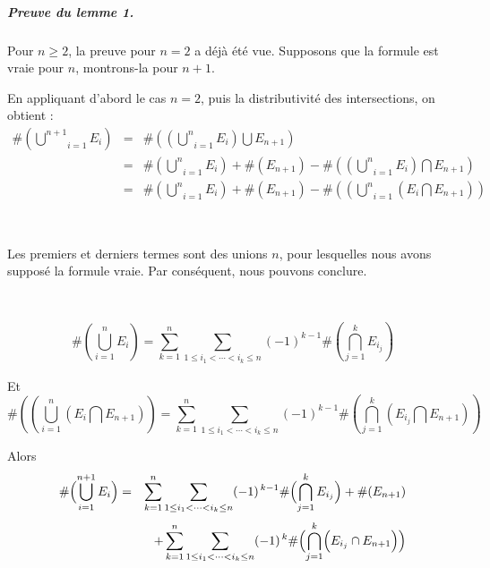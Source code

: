 \subparagraph{Preuve du lemme 1.}

Pour $n \geqslant 2$, la preuve pour $n = 2$ a d{\'e}j{\`a} {\'e}t{\'e} vue.
Supposons que la formule est vraie pour $n$, montrons-la pour $n + 1$.

En appliquant d'abord le cas $n = 2$, puis la distributivit{\'e} des
intersections, on obtient :
\begin{eqnarray*}
  \# \left( \underset{i = 1}{\overset{n + 1}{\bigcup}} E_i \right) & = & \#
  \left( \left( \underset{i = 1}{\overset{n}{\bigcup}} E_i \right) \bigcup
  E_{n + 1} \right)\\
  & = & \# \left( \underset{i = 1}{\overset{n}{\bigcup}} E_i \right) +\#
  (E_{n + 1}) -\# \left( \left( \underset{i = 1}{\overset{n}{\bigcup}} E_i
  \right) \bigcap E_{n + 1} \right)\\
  & = & \# \left( \underset{i = 1}{\overset{n}{\bigcup}} E_i \right) +\#
  (E_{n + 1}) -\# \left( \left( \underset{i = 1}{\overset{n}{\bigcup}} \right.
  \left( E_i \bigcap E_{n + 1} \right) \right)
\end{eqnarray*}


\

Les premiers et derniers termes sont des unions $n$, pour lesquelles nous
avons suppos{\'e} la formule vraie. Par cons{\'e}quent, nous pouvons conclure.

\


\[ \# \left( \underset{i = 1}{\overset{n}{\bigcup}} E_i \right) =
   \underset{}{\overset{n}{\underset{k = 1}{\sum}} \underset{1 \leqslant i_1 <
   \cdots < i_k \leqslant n}{\sum} (- 1)^{k - 1} \# \left(
   \overset{k}{\underset{j = 1}{\bigcap}} E_{i_j} \right)} \]


Et
\[ \# \left( \left( \underset{i = 1}{\overset{n}{\bigcup}} \right. \left( E_i
   \bigcap E_{n + 1} \right) \right) = \overset{n}{\underset{k = 1}{\sum}}
   \underset{1 \leqslant i_1 < \cdots < i_k \leqslant n}{\sum} (- 1)^{k - 1}
   \# \left( \overset{k}{\underset{j = 1}{\bigcap}} \left( E_{i_j} \bigcap
   E_{n + 1} \right) \right) \]


Alors
\begin{eqnarray*}
\#\Bigl(\bigcup_{i=1}^{n+1} E_i\Bigr)
& = &
\sum_{k=1}^{n} \sum_{1 \le i_1 < \cdots < i_k \le n} (-1)^{\,k-1} \#\Bigl(\bigcap_{j=1}^{k} E_{i_j}\Bigr)
+ \#(E_{n+1}) \\[1mm]
& & + \sum_{k=1}^{n} \sum_{1 \le i_1 < \cdots < i_k \le n} (-1)^{\,k} \#\Bigl(\bigcap_{j=1}^{k} \Bigl(E_{i_j} \cap E_{n+1}\Bigr)\Bigr)
\end{eqnarray*}



